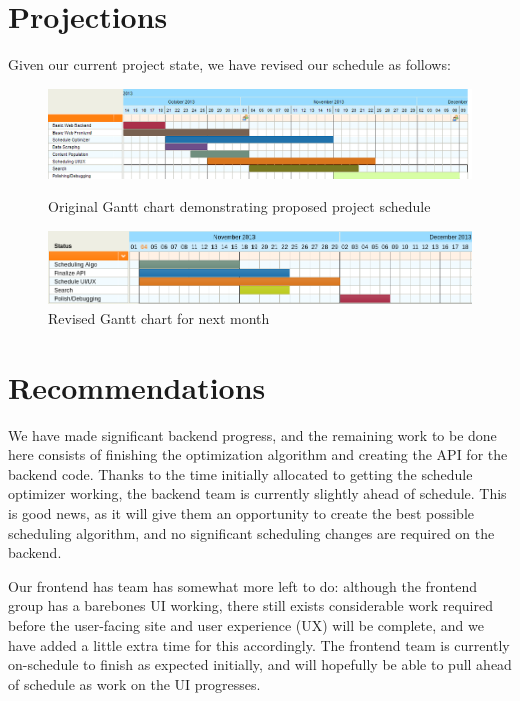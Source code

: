 \section{Projections}
Given our current project state, we have revised our schedule as follows:
\begin{figure}[h!]
  \centering
  \includegraphics[width=\textwidth]{gantt.png}
  \caption{Original Gantt chart demonstrating proposed project schedule}
  \includegraphics[width=\textwidth]{revised-gantt.png}
  \caption{Revised Gantt chart for next month}
\end{figure}

\section{Recommendations}

We have made significant backend progress, and the remaining work to be done
here consists of finishing the optimization algorithm and
creating the API for the backend code. Thanks to the time initially
allocated to getting the schedule optimizer working, the backend team is
currently slightly ahead of schedule. This is good news, as it will
give them an opportunity to create the best possible scheduling algorithm,
and no significant scheduling changes are required on the backend.

Our frontend has team has somewhat more left to do: although the frontend group
has a barebones UI working, there still exists considerable work required
before the user-facing site and user experience (UX) will be complete, and 
we have added a little extra time for this accordingly.
The frontend team is currently on-schedule to finish as expected initially,
and will hopefully be able to pull ahead of schedule as work on the UI
progresses.


